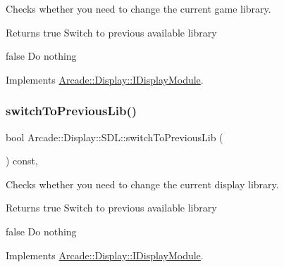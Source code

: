 Checks whether you need to change the current game library. 

\begin{DoxyReturn}{Returns}
true Switch to previous available library 

false Do nothing 
\end{DoxyReturn}


Implements \mbox{\hyperlink{classArcade_1_1Display_1_1IDisplayModule_a3bbbfe00907c8f3e4c7ef1aadedcc513}{Arcade\+::\+Display\+::\+I\+Display\+Module}}.

\mbox{\label{classArcade_1_1Display_1_1SDL_a27364feeadd0eb907f91e9e4c2ec1ef2}} 
\subsubsection{\texorpdfstring{switchToPreviousLib()}{switchToPreviousLib()}}
{\footnotesize\ttfamily bool Arcade\+::\+Display\+::\+S\+D\+L\+::switch\+To\+Previous\+Lib (\begin{DoxyParamCaption}{ }\end{DoxyParamCaption}) const\hspace{0.3cm}{\ttfamily [final]}, {\ttfamily [virtual]}}



Checks whether you need to change the current display library. 

\begin{DoxyReturn}{Returns}
true Switch to previous available library 

false Do nothing 
\end{DoxyReturn}


Implements \mbox{\hyperlink{classArcade_1_1Display_1_1IDisplayModule_a498d51597164e9f92e97ec2afee426b0}{Arcade\+::\+Display\+::\+I\+Display\+Module}}.

